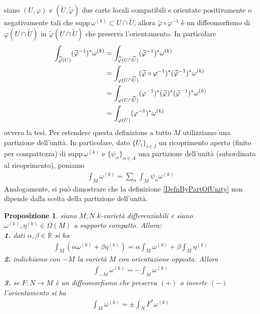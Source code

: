 \documentclass[twoside, 11pt]{amsbook}
\makeatletter
\newcommand{\0}{{(0)}}
\newcommand{\3}{{(3)}}
\theoremstyle{colonplain}
\newtheorem{prop}[thm]{Proposizione}
\theoremstyle{colondefinition}
\theoremstyle{colonremark}
\numberwithin{equation}{chapter}
\renewcommand{\proofname}{Dimostrazione}
\renewenvironment{proof}[1][\proofname]{\par
  \pushQED{\qed}%
  \normalfont \topsep6\p@\@plus6\p@\relax
  \trivlist
  \item[\hskip\labelsep\bfseries #1:]\ignorespaces
}{%
  \popQED\endtrivlist\@endpefalse
}
\makeatother
\begin{document}
\begin{proof} siano $(U, \varphi)$ e $(\widetilde{U}, \widetilde{\varphi})$ due carte locali compatibili e orientate positivamente o negativamente tali che $\mathrm{supp} \, \omega^{(k)} \subset U \cap \widetilde{U}$, allora $\widetilde{\varphi} \circ \varphi^{-1}$ è un diffeomorfismo di $\varphi(U \cap \widetilde{U})$ in $\widetilde\varphi(U \cap \widetilde{U})$ che preserva l'orientamento. In particolare
\begin{align}
    \int_{\widetilde{\varphi}(U)} (\widetilde{\varphi}^{-1})^*\omega^{(k)} &= \int_{\widetilde{\varphi}(U \cap \widetilde{U})} (\widetilde{\varphi}^{-1})^*\omega^{(k)} \notag \\
    &= \int_{\varphi(U \cap \widetilde{U})} (\widetilde{\varphi} \circ \varphi^{-1})^*(\widetilde{\varphi}^{-1})^*\omega^{(k)} \notag \\
    &= \int_{\varphi(U \cap \widetilde{U})} (\varphi^{-1})^*(\widetilde{\varphi})^*(\widetilde{\varphi}^{-1})^*\omega^{(k)} \notag \\
    &= \int_{\varphi(U)}(\varphi^{-1})^*\omega^{(k)}
\end{align}
ovvero la tesi.
\end{proof}
Per estendere questa definizione a tutto $M$ utilizziamo una partizione dell'unità. In particolare, dato $\{U_i\}_{i \in I}$ un ricoprimento aperto (finito per compattezza) di $\mathrm{supp} \, \omega^{(k)}$ e $\{\psi_\alpha\}_{\alpha \in A}$ una partizione dell'unità (subordinata al ricoprimento), poniamo
\begin{align}\label{DefnByPartOfUnity}
    \int_M \omega^{(k)} = \sum_\alpha \int_M \psi_\alpha \omega^{(k)}
\end{align}
Analogamente, si può dimostrare che la definizione \eqref{DefnByPartOfUnity} non dipende dalla scelta della partizione dell'unità.
\begin{prop} siano $M, N$ $k$-varietà differenziabili e siano $\omega^{(k)}, \eta^{(k)} \in \Omega(M)$ a supporto compatto. Allora: \\
\textbf{1.} dati $\alpha, \beta \in \mathbb{R}$ si ha
\begin{align}
    \int_M (\alpha\omega^{(k)} + \beta\eta^{(k)}) = \alpha\int_M \omega^{(k)} + \beta\int_M \eta^{(k)}
\end{align}
\textbf{2.} indichiamo con $-M$ la varietà $M$ con orientazione opposta. Allora
\begin{align}
    \int_{-M} \omega^{(k)} = -\int_M \omega^{(k)}
\end{align}
\textbf{3.} se $F : N \longrightarrow M$ è un diffeomorfismo che preserva $(+)$ o inverte $(-)$ l'orientamento si ha
\begin{align}
    \int_M \omega^{(k)} = \pm\int_{N} F^*\omega^{(k)}
\end{align}
\end{prop}
\end{document}
